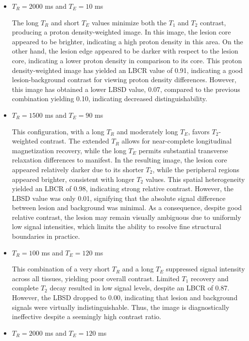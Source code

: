 \documentclass[10pt,a4paper,twoside]{article}
\begin{document}
\begin{itemize}
    \item  $T_R=2000$ ms and  $T_E=10$ ms

The long $T_R$ and short $T_E$ values minimize both the $T_1$ and $T_2$ contrast, producing a proton density-weighted image. In this image, the lesion core appeared to be brighter, indicating a high proton density in this area. On the other hand, the lesion edge appeared to be darker with respect to the lesion core, indicating a lower proton density in comparison to its core. This proton density-weighted image has yielded an LBCR value of 0.91, indicating a good lesion-background contrast for viewing proton density differences. However, this image has obtained a lower LBSD value, 0.07, compared to the previous combination yielding 0.10, indicating decreased distinguishability.

    \item $T_R = 1500$ ms and $T_E = 90$ ms

This configuration, with a long \( T_R \) and moderately long \( T_E \), favors \( T_2 \)-weighted contrast. The extended \( T_R \) allows for near-complete longitudinal magnetization recovery, while the long \( T_E \) permits substantial transverse relaxation differences to manifest. In the resulting image, the lesion core appeared relatively darker due to its shorter \( T_2 \), while the peripheral regions appeared brighter, consistent with longer \( T_2 \) values. This spatial heterogeneity yielded an LBCR of 0.98, indicating strong relative contrast. However, the LBSD value was only 0.01, signifying that the absolute signal difference between lesion and background was minimal. As a consequence, despite good relative contrast, the lesion may remain visually ambiguous due to uniformly low signal intensities, which limits the ability to resolve fine structural boundaries in practice.


    \item $T_R = 100$ ms and $T_E = 120$ ms

This combination of a very short \( T_R \) and a long \( T_E \) suppressed signal intensity across all tissues, yielding poor overall contrast. Limited \( T_1 \) recovery and complete \( T_2 \) decay resulted in low signal levels, despite an LBCR of 0.87. However, the LBSD dropped to 0.00, indicating that lesion and background signals were virtually indistinguishable. Thus, the image is diagnostically ineffective despite a seemingly high contrast ratio.


    \item $T_R = 2000$ ms and $T_E = 120$ ms


\end{itemize}
\end{document}
